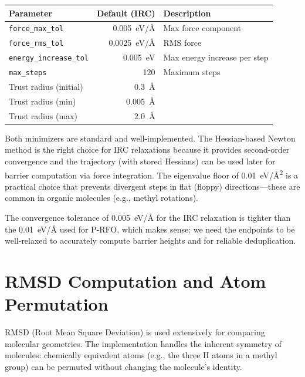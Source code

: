 \documentclass[11pt,a4paper]{article}
\begin{document}
\begin{threshbox}
\begin{tabular}{lrl}
\toprule
Parameter & Default (IRC) & Description \\
\midrule
\texttt{force\_max\_tol} & \SI{0.005}{eV/\angstrom} & Max force component \\
\texttt{force\_rms\_tol} & \SI{0.0025}{eV/\angstrom} & RMS force \\
\texttt{energy\_increase\_tol} & \SI{0.005}{eV} & Max energy increase per step \\
\texttt{max\_steps} & 120 & Maximum steps \\
Trust radius (initial) & \SI{0.3}{\angstrom} & \\
Trust radius (min) & \SI{0.005}{\angstrom} & \\
Trust radius (max) & \SI{2.0}{\angstrom} & \\
\bottomrule
\end{tabular}
\end{threshbox}

\begin{evaluation}
Both minimizers are standard and well-implemented. The Hessian-based Newton method is the right choice for IRC relaxations because it provides second-order convergence and the trajectory (with stored Hessians) can be used later for barrier computation via force integration. The eigenvalue floor of \SI{0.01}{eV/\angstrom^2} is a practical choice that prevents divergent steps in flat (floppy) directions---these are common in organic molecules (e.g., methyl rotations).

The convergence tolerance of \SI{0.005}{eV/\angstrom} for the IRC relaxation is tighter than the \SI{0.01}{eV/\angstrom} used for P-RFO, which makes sense: we need the endpoints to be well-relaxed to accurately compute barrier heights and for reliable deduplication.
\end{evaluation}


\section{RMSD Computation and Atom Permutation}
\label{sec:rmsd}

RMSD (Root Mean Square Deviation) is used extensively for comparing molecular geometries. The implementation handles the inherent symmetry of molecules: chemically equivalent atoms (e.g., the three H atoms in a methyl group) can be permuted without changing the molecule's identity.
\end{document}
